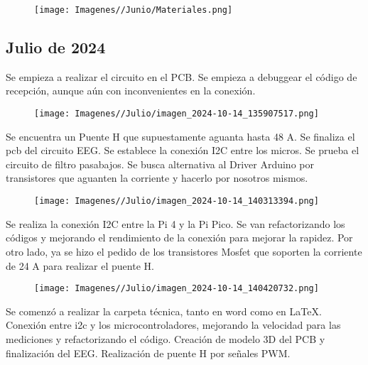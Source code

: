 \documentclass{article}
\begin{document}
\begin{figure}[H]
    \centering
    \texttt{[image: Imagenes//Junio/Materiales.png]}
\end{figure}



\newpage







\begin{center}
    \section{Julio de 2024}
\end{center}
Se empieza a realizar el circuito en el PCB. Se empieza a debuggear el código de recepción, aunque aún con inconvenientes en la conexión.

\begin{figure}[H]
    \centering
    \texttt{[image: Imagenes//Julio/imagen\_2024-10-14\_135907517.png]}
\end{figure}

Se encuentra un Puente H que supuestamente aguanta hasta 48 A. Se finaliza el pcb del circuito EEG. Se establece la conexión I2C entre los micros. Se prueba el circuito de filtro pasabajos. Se busca alternativa al Driver Arduino por transistores que aguanten la corriente y hacerlo por nosotros mismos. 

\begin{figure}[H]
    \centering
    \texttt{[image: Imagenes//Julio/imagen\_2024-10-14\_140313394.png]}
\end{figure}

\newpage
Se realiza la conexión I2C entre la Pi 4 y la Pi Pico. Se van refactorizando los códigos y mejorando el rendimiento de la conexión para mejorar la rapidez. Por otro lado, ya se hizo el pedido de los transistores Mosfet que soporten la corriente de 24 A para realizar el puente H.

\begin{figure}[H]
    \centering
    \texttt{[image: Imagenes//Julio/imagen\_2024-10-14\_140420732.png]}
\end{figure}
Se comenzó a realizar la carpeta técnica, tanto en word como en LaTeX. Conexión entre i2c y los microcontroladores, mejorando la velocidad para las mediciones y refactorizando el código. Creación de modelo 3D del PCB y finalización del EEG. Realización de puente H por señales PWM.
\end{document}
